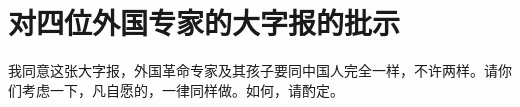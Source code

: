 \section[对四位外国专家的大字报的批示（一九六六年八月二十九日）]{对四位外国专家的大字报的批示}


我同意这张大字报，外国革命专家及其孩子要同中国人完全一样，不许两样。请你们考虑一下，凡自愿的，一律同样做。如何，请酌定。


